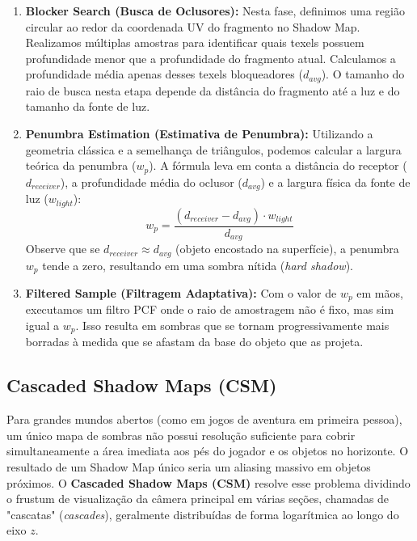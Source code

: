 \begin{enumerate}
    \item \textbf{Blocker Search (Busca de Oclusores):} 
    Nesta fase, definimos uma região circular ao redor da coordenada UV do fragmento no Shadow Map. Realizamos múltiplas amostras para identificar quais texels possuem profundidade menor que a profundidade do fragmento atual. Calculamos a profundidade média apenas desses texels bloqueadores ($d_{avg}$). O tamanho do raio de busca nesta etapa depende da distância do fragmento até a luz e do tamanho da fonte de luz.
    
    \item \textbf{Penumbra Estimation (Estimativa de Penumbra):} 
    Utilizando a geometria clássica e a semelhança de triângulos, podemos calcular a largura teórica da penumbra ($w_p$). A fórmula leva em conta a distância do receptor ($d_{receiver}$), a profundidade média do oclusor ($d_{avg}$) e a largura física da fonte de luz ($w_{light}$):
    \begin{equation}
        w_p = \frac{(d_{receiver} - d_{avg}) \cdot w_{light}}{d_{avg}}
    \end{equation}
    Observe que se $d_{receiver} \approx d_{avg}$ (objeto encostado na superfície), a penumbra $w_p$ tende a zero, resultando em uma sombra nítida (\textit{hard shadow}).
    
    \item \textbf{Filtered Sample (Filtragem Adaptativa):} 
    Com o valor de $w_p$ em mãos, executamos um filtro PCF onde o raio de amostragem não é fixo, mas sim igual a $w_p$. Isso resulta em sombras que se tornam progressivamente mais borradas à medida que se afastam da base do objeto que as projeta.
\end{enumerate}

\subsection{Cascaded Shadow Maps (CSM)}

Para grandes mundos abertos (como em jogos de aventura em primeira pessoa), um único mapa de sombras não possui resolução suficiente para cobrir simultaneamente a área imediata aos pés do jogador e os objetos no horizonte. O resultado de um Shadow Map único seria um aliasing massivo em objetos próximos. O \textbf{Cascaded Shadow Maps (CSM)} resolve esse problema dividindo o frustum de visualização da câmera principal em várias seções, chamadas de "cascatas" (\textit{cascades}), geralmente distribuídas de forma logarítmica ao longo do eixo $z$.

